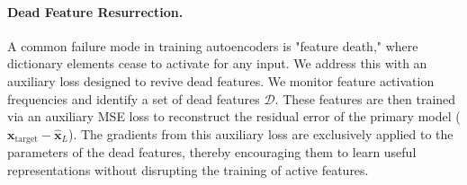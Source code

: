 \paragraph{Dead Feature Resurrection.}
A common failure mode in training autoencoders is "feature death," where dictionary elements cease to activate for any input. We address this with an auxiliary loss designed to revive dead features. We monitor feature activation frequencies and identify a set of dead features $\mathcal{D}$. These features are then trained via an auxiliary MSE loss to reconstruct the residual error of the primary model ($\mathbf{x}_{\text{target}} - \hat{\mathbf{x}}_L$). The gradients from this auxiliary loss are exclusively applied to the parameters of the dead features, thereby encouraging them to learn useful representations without disrupting the training of active features.

